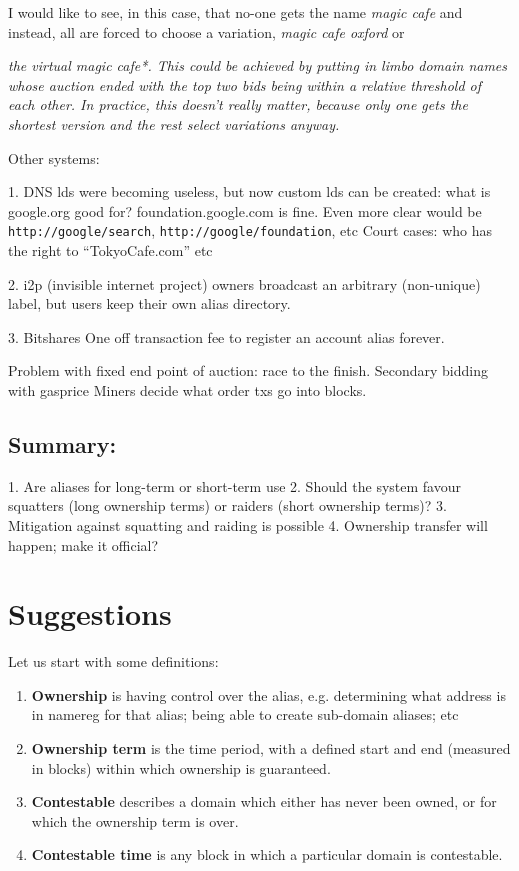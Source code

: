 \documentclass[10pt,a4paper]{article}
\begin{document}
I would like to see, in this case, that no-one gets the name {\it magic cafe} and instead, all are forced to choose a variation, {\it magic cafe oxford} or {\it the virtual magic cafe*. This could be achieved by putting in limbo domain names whose auction ended with the top two bids being within a relative threshold of each other. In practice, this doesn't really matter, because only one gets the shortest version and the rest select variations anyway.


Other systems:

1. DNS
	lds were becoming useless, but now custom 	lds can be created: what is google.org good for? foundation.google.com is fine. Even more clear would be {\tt http://google/search}, {\tt http://google/foundation}, etc
Court cases: who has the right to ``TokyoCafe.com'' etc

2. i2p (invisible internet project)
owners broadcast an arbitrary (non-unique) label, but users keep their own alias directory.

3. Bitshares
One off transaction fee to register an account alias forever.


Problem with fixed end point of auction: race to the finish.
Secondary bidding with gasprice
Miners decide what order txs go into blocks.





\subsection*{Summary:}

1. Are aliases for long-term or short-term use
2. Should the system favour squatters (long ownership terms) or raiders (short ownership terms)?
3. Mitigation against squatting and raiding is possible
4. Ownership transfer will happen; make it official?


\section*{Suggestions}

Let us start with some definitions:

\begin{enumerate}
\item{\bf Ownership} is having control over the alias, e.g. determining what address is in namereg for that alias; being able to create sub-domain aliases; etc
\item{\bf Ownership term} is the time period, with a defined start and end (measured in blocks) within which ownership is guaranteed.
\item{\bf Contestable} describes a domain which either has never been owned, or for which the ownership term is over.
\item{\bf Contestable time} is any block in which a particular domain is contestable.
\end{enumerate}

}
\end{document}
